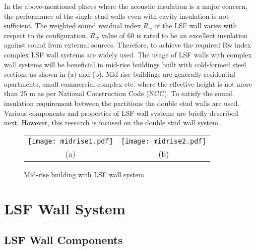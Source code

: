 In the above-mentioned places where the acoustic insulation is a major concern, the performance of the single stud walls even with cavity insulation is not sufficient. The weighted sound residual index $R_w$ of the LSF wall varies with respect to its configuration. $R_w$ value of 60 is rated to be an excellent insulation against sound from external sources. Therefore, to achieve the required Rw index complex LSF wall systems are widely used. The usage of LSF walls with complex wall systems will be beneficial in mid-rise buildings built with cold-formed steel sections as shown in (a) and (b). Mid-rise buildings are generally residential apartments, small commercial complex etc. where the effective height is not more than 25 m as per National Construction Code (NCC). To satisfy the sound insulation requirement between the partitions the double stud walls are used. Various components and properties of LSF wall systems are briefly described next. However, this research is focused on the double stud wall system.
	 
\begin{figure}[htbp]
	\begin{center}	
		\begin{tabular}{cc}
			\texttt{[image: midrise1.pdf]} &
			\texttt{[image: midrise2.pdf]} \\
			(a) &
			(b) \\
		\end{tabular}
		\caption{Mid-rise building with LSF wall system}
		\label{fig:midrise}
\end{center}
\end{figure}

\section{LSF Wall System}
\subsection{LSF Wall Components}

